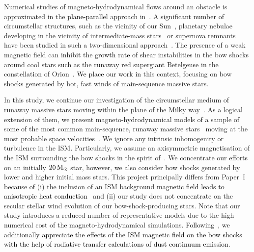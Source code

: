 \documentclass[useAMS,usenatbib]{mn2e}
\begin{document}
Numerical studies of magneto-hydrodynamical flows around an obstacle is approximated 
in the \textcolor{black}{plane-parallel} approach in~\citet{sterck_phpl_1998,
sterck_aa_343_1999}. A significant number of circumstellar structures, such as
the vicinity of our Sun~\citep{pogolerov_aa_321_1997}, 
planetary nebulae developing in the vicinity of intermediate-mass
stars~\citep{heiligman_mnras_191_1980} or supernova
remnants~\citep{rozyczka_274_MNRAS_1995} have been studied in such a two-dimensional
approach~\citep[see also][]{soker_apj_484_1997,pogolerov_aa_354_2000}. The 
presence of a weak magnetic field can inhibit the \textcolor{black}{growth rate of
shear} instabilities in the bow shocks around cool stars such as the runaway 
red supergiant Betelgeuse in the constellation of
Orion~\citep{vanmarle_aa_561_2014}. \textcolor{black}{We place our work} in this context, focusing 
on bow shocks generated by hot, fast winds of main-sequence massive stars. 


In this study, we continue our investigation of the circumstellar medium of
runaway massive stars moving within the plane of the Milky 
way~\citep[Paper~I,][]{meyer_mnras_450_2015,meyer_mnras_459_2016}. As a
logical extension of them, we present magneto-hydrodynamical
models of a sample of some \textcolor{black}{of} the most common main-sequence, runaway massive
stars~\citep{kroupa_mnras_322_2001} moving at the most probable space
velocities~\citep{eldridge_mnras_414_2011}. We ignore any intrinsic inhomogenity
or turbulence in the ISM. Particularly, we assume an axisymmetric magnetisation
of the ISM surrounding the bow shocks in the spirit of~\citet{vanmarle_aa_561_2014}. We concentrate our
efforts on an initially $20\, \rm M_{\odot}$ star, however, we also consider bow
shocks generated by lower and higher initial mass stars. This project
principally differs from Paper~I because \textcolor{black}{of} (i) the inclusion of an ISM background
\textcolor{black}{magnetic field leads to anisotropic heat conduction}~\citep[see, e.g.][]{balsara_mnras_386_2008} and (ii) our study does not
concentrate on the \textcolor{black}{secular} stellar wind evolution of our bow-shock-producing stars. Note that our
study introduces a reduced number of representative models due to the high
numerical cost of the magneto-hydrodynamical simulations.  
\textcolor{black}{
Following~\citet{acreman_mnras_456_2016}, we additionally appreciate the effects of the ISM magnetic field on the 
bow shocks with the help of radiative transfer calculations of dust continuum emission. 
}
\end{document}
